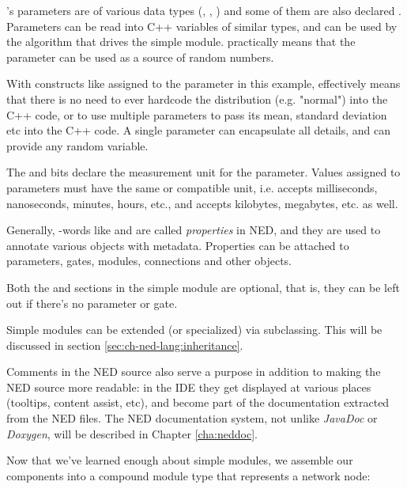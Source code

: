 's parameters are of various data types (, ,
) and some of them are also declared . Parameters
can be read into C++ variables of similar types, and can be used by the
algorithm that drives the simple module.  practically means
that the parameter can be used as a source of random numbers.

\begin{note}
    With constructs like  assigned to the 
    parameter in this example,  effectively means that
    there is no need to ever hardcode the distribution (e.g. "normal")
    into the C++ code, or to use multiple parameters to pass its mean,
    standard deviation etc into the C++ code. A single parameter can
    encapsulate all details, and can provide any random variable.
\end{note}

The  and  bits declare the measurement unit
for the parameter. Values assigned to parameters must have the same or
compatible unit, i.e.  accepts milliseconds, nanoseconds,
minutes, hours, etc., and  accepts kilobytes, megabytes,
etc. as well.

Generally, -words like  and  are called
\textit{properties} in NED, and they are used to annotate various objects
with metadata. Properties can be attached to parameters, gates, modules,
connections and other objects.

Both the  and  sections in the simple module are
optional, that is, they can be left out if there's no parameter or gate.

Simple modules can be extended (or specialized) via subclassing. This will be
discussed in section \ref{sec:ch-ned-lang:inheritance}.

Comments in the NED source also serve a purpose in addition to making
the NED source more readable: in the {\opp} IDE they get displayed
at various places (tooltips, content assist, etc), and become part
of the documentation extracted from the NED files.
The NED documentation system, not unlike \textit{JavaDoc}
or \textit{Doxygen}, will be described in Chapter \ref{cha:neddoc}.

Now that we've learned enough about simple modules, we assemble our components
into a compound module type that represents a network node:

